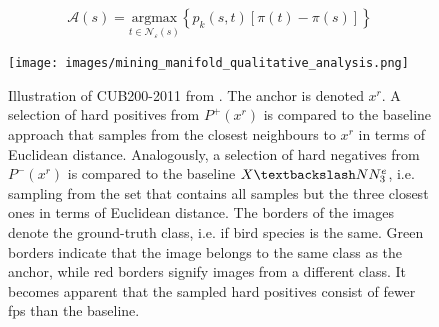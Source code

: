 \begin{equation}
    \mathcal{A}(s) = \underset{t \in \mathcal{N_\varepsilon}(s)}{\text{argmax}} \left\{ p_k(s,t)\left[ \pi(t)-\pi(s) \right] \right\}
    \label{eq:authority_ascent_shift}
\end{equation}



\begin{figure}[!htb] %
    \centering
    \texttt{[image: images/mining\_manifold\_qualitative\_analysis.png]}
    \caption{Illustration of CUB200-2011 from \citet{mining_manifolds_2018}.
    The anchor is denoted $x^r$.
    A selection of hard positives from $P^+(x^r)$ is compared to the 
    baseline approach that samples from the closest neighbours to $x^r$ in 
    terms of Euclidean distance.
    Analogously, a selection of hard negatives from $P^-(x^r)$ 
    is compared to the baseline $X \textbackslash NN^e_3$, 
    i.e. sampling from the set that contains all samples but the three closest ones in 
    terms of Euclidean distance.
    The borders of the images denote the ground-truth class, i.e. if bird species is the same.
    Green borders indicate that the image belongs to the same class as the anchor, 
    while red borders signify images from a different class.
    It becomes apparent that the sampled hard positives consist of fewer \acp{fp} 
    than the baseline.
    }
    \label{fig:manifold_mining_qualitative_analysis}
\end{figure}

